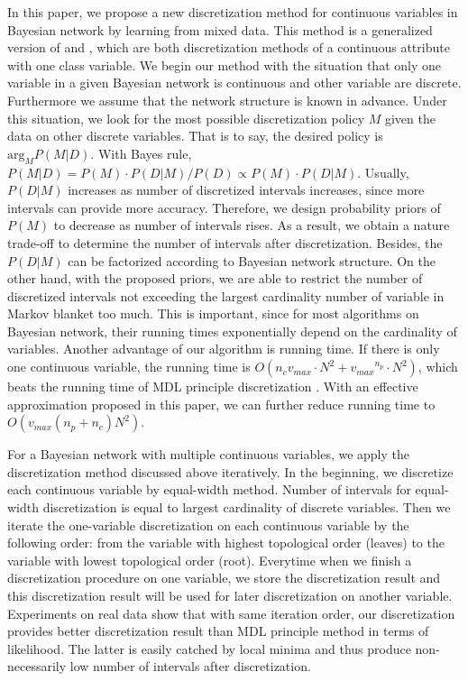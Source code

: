 In this paper, we propose a new discretization method for continuous variables in Bayesian network by learning from mixed data. This method is a generalized version of  \citet{Boulle_2006} and \citet{Lustgarten_2011}, which are both discretization methods of a continuous attribute with one class variable. We begin our method with the situation that only one variable in a given Bayesian network is continuous and other variable are discrete. Furthermore we assume that the network structure is known in advance. Under this situation, we look for the most possible discretization policy $M$ given the data on other discrete variables. That is to say, the desired policy is $\textrm{arg}_M P(M|D)$. With Bayes rule, $P(M|D) = P(M) \cdot P(D|M) / P(D) \propto P(M)\cdot P(D|M)$. Usually, $P(D|M)$ increases as number of discretized intervals increases, since more intervals can provide more accuracy. Therefore, we design probability priors of $P(M)$ to decrease as number of intervals rises. As a result, we obtain a nature trade-off to determine the number of intervals after discretization. Besides, the $P(D|M)$ can be factorized according to Bayesian network structure. On the other hand, with the proposed priors, we are able to restrict the number of discretized intervals not exceeding the largest cardinality number of variable in Markov blanket too much. This is important, since for most algorithms on Bayesian network, their running times exponentially depend on the cardinality of variables. Another advantage of our algorithm is running time. If there is only one continuous variable, the running time is $O(n_c  {v_{max}} \cdot N^2 + {v_{max}}^{n_p} \cdot N^2)$, which beats the running time of MDL principle discretization \citep{Friedman_1996}. With an effective approximation proposed in this paper, we can further reduce running time to $O({v_{max}}(n_p+n_c)N^2)$.

For a Bayesian network with multiple continuous variables, we apply the discretization method discussed above iteratively. In the beginning, we discretize each continuous variable by equal-width method. Number of intervals for equal-width discretization is equal to largest cardinality of discrete variables. Then we iterate the one-variable discretization on each continuous variable by the following order: from the variable with highest topological order (leaves) to the variable with lowest topological order (root). Everytime when we finish a discretization procedure on one variable, we store the discretization result and this discretization result will be used for later discretization on another variable. Experiments on real data show that with same iteration order, our discretization provides better discretization result than MDL principle method in terms of likelihood. The latter is easily catched by local minima and thus produce non-necessarily low number of intervals after discretization.

